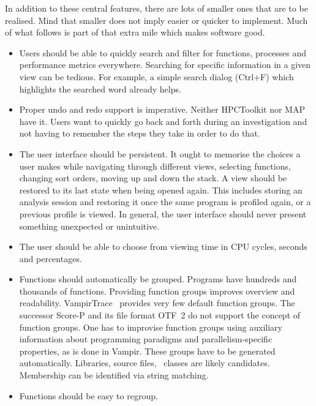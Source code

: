 \documentclass[a4paper, final, diplominf]{zih-template}
\begin{document}
In addition to these central features, there are lots of smaller ones that are to be realised.
Mind that smaller does not imply easier or quicker to implement.
Much of what follows is part of that extra mile which makes software good.
\begin{itemize}
	\item Users should be able to quickly search and filter for functions, processes and performance metrics everywhere.
		Searching for specific information in a given view can be tedious.
		For example, a simple search dialog (Ctrl+F) which highlights the searched word already helps.\vspace{-0.5ex}
	\item Proper undo and redo support is imperative.
		Neither HPCToolkit nor MAP have it.
		Users want to quickly go back and forth during an investigation and not having to remember the steps they take in order to do that.\vspace{-0.5ex}
	\item The user interface should be persistent.
		It ought to memorise the choices a user makes while navigating through different views, selecting functions, changing sort orders, moving up and down the stack.
		A view should be restored to its last state when being opened again.
		This includes storing an analysis session and restoring it once the same program is profiled again, or a previous profile is viewed.
		In general, the user interface should never present something unexpected or unintuitive.\vspace{-0.5ex}
	\item The user should be able to choose from viewing time in CPU cycles, seconds and percentages.\vspace{-0.5ex}
	\item Functions should automatically be grouped.
		Programs have hundreds and thousands of functions.
		Providing function groups improves overview and readability.
		VampirTrace~\cite{vampirtrace} provides very few default function groups.
		The successor Score-P and its file format OTF~2 do not support the concept of function groups.
		One has to improvise function groups using auxiliary information about programming paradigms and parallelism-specific properties, as is done in Vampir.
		These groups have to be generated automatically.
		Libraries, source files, \cpp~classes are likely candidates.
		Membership can be identified via string matching.\vspace{-0.5ex}
	\item Functions should be easy to regroup.

\end{itemize}
\end{document}

